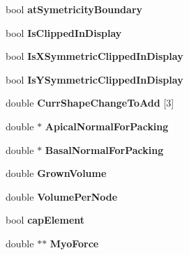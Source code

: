 \begin{DoxyCompactItemize}
\item 
\hypertarget{classShapeBase_a3d15f14d23230682242ed063872617af}{}bool {\bfseries at\+Symetricity\+Boundary}\label{classShapeBase_a3d15f14d23230682242ed063872617af}

\item 
\hypertarget{classShapeBase_a6f5e25bc9b4376c0aa28aec59af6cf2f}{}bool {\bfseries Is\+Clipped\+In\+Display}\label{classShapeBase_a6f5e25bc9b4376c0aa28aec59af6cf2f}

\item 
\hypertarget{classShapeBase_ad58b945ab4de36d2ab56b8a33fd10c20}{}bool {\bfseries Is\+X\+Symmetric\+Clipped\+In\+Display}\label{classShapeBase_ad58b945ab4de36d2ab56b8a33fd10c20}

\item 
\hypertarget{classShapeBase_ab7376a727388707fc2502490701e48a0}{}bool {\bfseries Is\+Y\+Symmetric\+Clipped\+In\+Display}\label{classShapeBase_ab7376a727388707fc2502490701e48a0}

\item 
\hypertarget{classShapeBase_a3d48903871978d77a77cb77f569975c0}{}double {\bfseries Curr\+Shape\+Change\+To\+Add} \mbox{[}3\mbox{]}\label{classShapeBase_a3d48903871978d77a77cb77f569975c0}

\item 
\hypertarget{classShapeBase_ab84cbf988437cd20fcceee7a24d0c3a8}{}double $\ast$ {\bfseries Apical\+Normal\+For\+Packing}\label{classShapeBase_ab84cbf988437cd20fcceee7a24d0c3a8}

\item 
\hypertarget{classShapeBase_a87f03cc35ac66eeb14487c5f33097891}{}double $\ast$ {\bfseries Basal\+Normal\+For\+Packing}\label{classShapeBase_a87f03cc35ac66eeb14487c5f33097891}

\item 
\hypertarget{classShapeBase_a8a1bafcaf21f040dd137abfe434a75a9}{}double {\bfseries Grown\+Volume}\label{classShapeBase_a8a1bafcaf21f040dd137abfe434a75a9}

\item 
\hypertarget{classShapeBase_a59943ecb9f8ec139c0f564c1fb91d876}{}double {\bfseries Volume\+Per\+Node}\label{classShapeBase_a59943ecb9f8ec139c0f564c1fb91d876}

\item 
\hypertarget{classShapeBase_a21420915ac7c8444e0e5b5f4e98d7322}{}bool {\bfseries cap\+Element}\label{classShapeBase_a21420915ac7c8444e0e5b5f4e98d7322}

\item 
\hypertarget{classShapeBase_a3aedc120b16a922ee9b0c1595630694b}{}double $\ast$$\ast$ {\bfseries Myo\+Force}\label{classShapeBase_a3aedc120b16a922ee9b0c1595630694b}


\end{DoxyCompactItemize}
